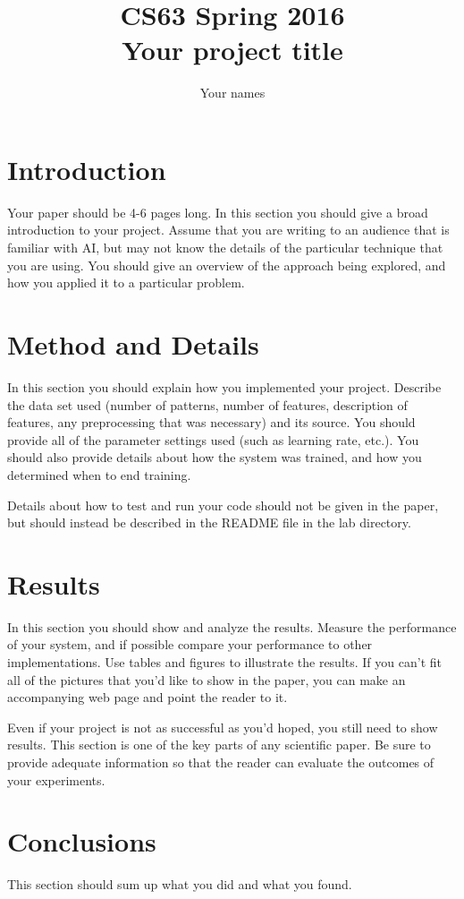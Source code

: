 \documentclass[11pt]{article}
\title{CS63 Spring 2016\\Your project title}
\author{Your names}
\date{}
\begin{document}
\maketitle

\section{Introduction}

Your paper should be 4-6 pages long.  In this section you should give
a broad introduction to your project.  Assume that you are writing to
an audience that is familiar with AI, but may not know the details of
the particular technique that you are using.  You should give an
overview of the approach being explored, and how you applied it to a
particular problem.

\section{Method and Details}

In this section you should explain how you implemented your project.
Describe the data set used (number of patterns, number of features,
description of features, any preprocessing that was necessary) and its
source.  You should provide all of the parameter settings used (such
as learning rate, etc.).  You should also provide details about how
the system was trained, and how you determined when to end training.

Details about how to test and run your code should not be given in the
paper, but should instead be described in the README file in the lab
directory. 

\section{Results}

In this section you should show and analyze the results.  Measure the
performance of your system, and if possible compare your performance
to other implementations. Use tables and figures to illustrate the
results.  If you can't fit all of the pictures that you'd like to show
in the paper, you can make an accompanying web page and point the
reader to it.

Even if your project is not as successful as you'd hoped, you still
need to show results.  This section is one of the key parts of any
scientific paper.  Be sure to provide adequate information so that the
reader can evaluate the outcomes of your experiments. 

\section{Conclusions}

This section should sum up what you did and what you found. 
\end{document}
